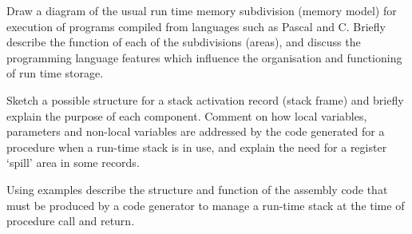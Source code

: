 \begin{subquestions}
\subquestion
Draw a diagram of the usual run time memory
subdivision (memory model) for execution of
programs compiled from languages such as
Pascal and C.  Briefly describe the function of each
of the subdivisions (areas), and discuss
the programming language features which influence
the organisation and functioning of run time storage.

\subquestion
Sketch a possible structure for a stack activation
record (stack frame) and briefly explain the purpose of
each component. Comment on how local variables,
parameters and non-local variables
are addressed by the code generated for a
procedure when a run-time stack is in use,
and explain the need for a register `spill' area
in some records.

\subquestion

Using examples describe the structure and function of the
assembly code
that must be produced by a code generator to manage a run-time
stack at the time of procedure call and return.

\end{subquestions}


 
\question

